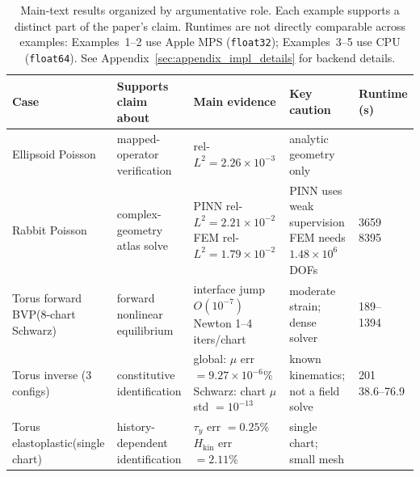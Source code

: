 \documentclass[sort&compress]{svjour3} %
\begin{document}
\begin{table}[htbp]
\centering
\scriptsize
\setlength{\tabcolsep}{2.2pt}
\caption{Main-text results organized by argumentative role. Each example supports a distinct part of the paper's claim. Runtimes are not directly comparable across examples: Examples~1--2 use Apple MPS (\texttt{float32}); Examples~3--5 use CPU (\texttt{float64}). See Appendix~\ref{sec:appendix_impl_details} for backend details.}
\label{tab:core_summary}
\begin{tabular}{>{\raggedright\arraybackslash}p{2.0cm}>{\raggedright\arraybackslash}p{1.6cm}>{\raggedright\arraybackslash}p{2.35cm}>{\raggedright\arraybackslash}p{2.9cm}>{\raggedright\arraybackslash}p{1.0cm}}
\toprule
Case & Supports claim about & Main evidence & Key caution & Runtime (s) \\
\midrule
Ellipsoid Poisson & mapped-operator verification & rel-$L^2 = 2.26\times10^{-3}$ & analytic geometry only & 106.3 \\
Rabbit Poisson & complex-geometry atlas solve & \shortstack[l]{PINN rel-$L^2 = 2.21\times10^{-2}$\\ FEM rel-$L^2 = 1.79\times10^{-2}$} & \shortstack[l]{PINN uses weak supervision\\ FEM needs $1.48\times10^{6}$ DOFs} & \shortstack[l]{3659\\8395} \\
Torus forward BVP\newline(8-chart Schwarz) & \shortstack[l]{forward nonlinear\\equilibrium} & \shortstack[l]{interface jump $O(10^{-7})$\\Newton 1--4 iters/chart} & moderate strain; dense solver & \shortstack[l]{189--\\1394} \\
Torus inverse (3 configs) & constitutive identification & \shortstack[l]{global: $\mu$ err $= 9.27\times10^{-6}\%$\\Schwarz: chart $\mu$ std $= 10^{-13}$} & known kinematics; not a field solve & \shortstack[l]{201\\38.6--76.9} \\
Torus elastoplastic\newline(single chart) & \shortstack[l]{history-dependent\\identification} & \shortstack[l]{$\tau_y$ err $= 0.25\%$\\$H_{\mathrm{kin}}$ err $= 2.11\%$} & single chart; small mesh & 32.5 \\
\bottomrule
\end{tabular}
\end{table}
\end{document}
